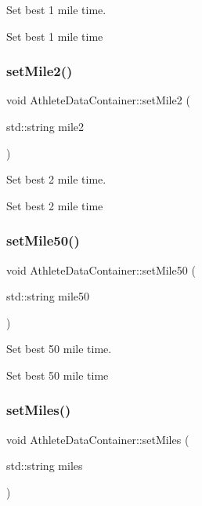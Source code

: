 Set best 1 mile time. 

Set best 1 mile time \mbox{\label{classAthleteDataContainer_ae3b4c644fb9cfeb806ecb4cdda7f6e9d}} 
\subsubsection{\texorpdfstring{setMile2()}{setMile2()}}
{\footnotesize\ttfamily void Athlete\+Data\+Container\+::set\+Mile2 (\begin{DoxyParamCaption}\item[{std\+::string}]{mile2 }\end{DoxyParamCaption})}



Set best 2 mile time. 

Set best 2 mile time \mbox{\label{classAthleteDataContainer_a3b2b888cc08f72178978d171e20212bc}} 
\subsubsection{\texorpdfstring{setMile50()}{setMile50()}}
{\footnotesize\ttfamily void Athlete\+Data\+Container\+::set\+Mile50 (\begin{DoxyParamCaption}\item[{std\+::string}]{mile50 }\end{DoxyParamCaption})}



Set best 50 mile time. 

Set best 50 mile time \mbox{\label{classAthleteDataContainer_a544e5714631cf94ffa8eb2891090af85}} 
\subsubsection{\texorpdfstring{setMiles()}{setMiles()}}
{\footnotesize\ttfamily void Athlete\+Data\+Container\+::set\+Miles (\begin{DoxyParamCaption}\item[{std\+::string}]{miles }\end{DoxyParamCaption})}



